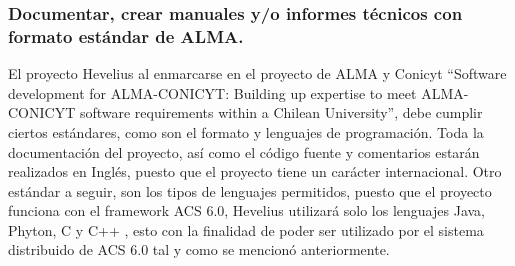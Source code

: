 \documentclass[letterpaper,spanish,10pt]{article}
\begin{document}
\subsubsection{Documentar, crear manuales y/o informes t\'ecnicos con formato est\'andar de ALMA.}
El proyecto Hevelius al enmarcarse en el proyecto de ALMA y Conicyt ``Software development for ALMA-CONICYT: Building up expertise to meet ALMA-CONICYT software requirements within a Chilean University'', debe cumplir ciertos est\'andares, como son el formato y lenguajes de programaci\'on. 
Toda la documentaci\'on del proyecto, as\'i como el c\'odigo fuente y comentarios estar\'an realizados en Ingl\'es, puesto que el proyecto tiene un car\'acter internacional.
Otro est\'andar a seguir, son los tipos de lenguajes permitidos, puesto que el proyecto funciona con el framework ACS 6.0, Hevelius utilizar\'a solo los lenguajes Java, Phyton, C y C++ , esto con la finalidad de poder ser utilizado por el sistema distribuido de ACS 6.0 tal y como se mencion\'o anteriormente.
\end{document}
